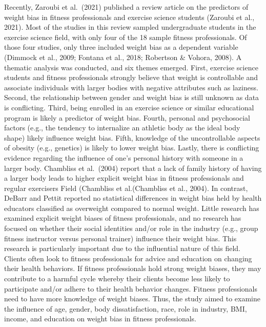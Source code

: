 \documentclass[
  jou,
  longtable,
  nolmodern,
  notxfonts,
  notimes,
  colorlinks=true,linkcolor=blue,citecolor=blue,urlcolor=blue]{apa7}
\begin{document}
Recently, Zaroubi et al.~(2021) published a review article on the
predictors of weight bias in fitness professionals and exercise science
students (Zaroubi et al., 2021). Most of the studies in this review
sampled undergraduate students in the exercise science field, with only
four of the 18 sample fitness professionals. Of those four studies, only
three included weight bias as a dependent variable (Dimmock et al.,
2009; Fontana et al., 2018; Robertson \& Vohora, 2008). A thematic
analysis was conducted, and six themes emerged. First, exercise science
students and fitness professionals strongly believe that weight is
controllable and associate individuals with larger bodies with negative
attributes such as laziness. Second, the relationship between gender and
weight bias is still unknown as data is conflicting. Third, being
enrolled in an exercise science or similar educational program is likely
a predictor of weight bias. Fourth, personal and psychosocial factors
(e.g., the tendency to internalize an athletic body as the ideal body
shape) likely influence weight bias. Fifth, knowledge of the
uncontrollable aspects of obesity (e.g., genetics) is likely to lower
weight bias. Lastly, there is conflicting evidence regarding the
influence of one's personal history with someone in a larger body.
Chambliss et al.~(2004) report that a lack of family history of having a
larger body leads to higher explicit weight bias in fitness
professionals and regular exercisers Field (Chambliss et al.(Chambliss
et al., 2004). In contrast, DeBarr and Pettit reported no statistical
differences in weight bias held by health educators classified as
overweight compared to normal weight. Little research has examined
explicit weight biases of fitness professionals, and no research has
focused on whether their social identities and/or role in the industry
(e.g., group fitness instructor versus personal trainer) influence their
weight bias. This research is particularly important due to the
influential nature of this field. Clients often look to fitness
professionals for advice and education on changing their health
behaviors. If fitness professionals hold strong weight biases, they may
contribute to a harmful cycle whereby their clients become less likely
to participate and/or adhere to their health behavior changes. Fitness
professionals need to have more knowledge of weight biases. Thus, the
study aimed to examine the influence of age, gender, body
dissatisfaction, race, role in industry, BMI, income, and education on
weight bias in fitness professionals.
\end{document}
